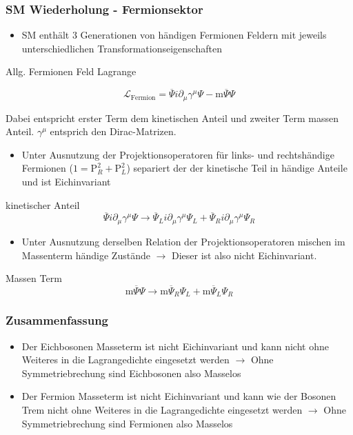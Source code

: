 \documentclass{beamer}
\begin{document}
\begin{frame}
\frametitle{SM Wiederholung - Fermionsektor}
\begin{itemize}
\item SM enthält 3 Generationen von händigen Fermionen Feldern mit jeweils unterschiedlichen Transformationseigenschaften 
\end{itemize}
\begin{block}{Allg. Fermionen Feld Lagrange}

\begin{equation*}
\mathscr{L}_{\text{Fermion}}=\overline{\Psi} i \partial_{\mu} \gamma^{\mu} \Psi -\text{m}\overline{\Psi} \Psi 
\end{equation*}
\end{block}
Dabei entspricht erster Term dem kinetischen Anteil und zweiter Term massen Anteil.  $\gamma^{\mu}$ entsprich den Dirac-Matrizen.
\end{frame}
\begin{frame}
\begin{itemize}
\item Unter Ausnutzung der Projektionsoperatoren für links- und rechtshändige Fermionen ($1=\text{P}_{R}^{2}+ \text{P}_{L}^{2}$) separiert der der kinetische Teil in händige Anteile und ist Eichinvariant 

\end{itemize}
\begin{block}{kinetischer Anteil}
\begin{equation*}
\overline{\Psi} i \partial_{\mu} \gamma^{\mu} \Psi  \rightarrow \overline{\Psi}_{L} i \partial_{\mu} \gamma^{\mu} \Psi_{L} +\overline{\Psi}_{R} i \partial_{\mu} \gamma^{\mu} \Psi_{R} 
\end{equation*}
\end{block}

\begin{itemize}
\item Unter Ausnutzung derselben Relation der Projektionsoperatoren mischen im Massenterm händige Zustände $\rightarrow$  Dieser ist also nicht Eichinvariant.
\end{itemize}

\begin{block}{Massen Term}
\begin{equation*}
\text{m}\overline{\Psi} \Psi  \rightarrow \text{m}\overline{\Psi}_{R} \Psi_{L} +\text{m}\overline{\Psi}_{L} \Psi_{R} 
\end{equation*}
\end{block}
\end{frame}
\begin{frame}
\frametitle{Zusammenfassung}
\begin{itemize}
\item Der Eichbosonen Masseterm ist nicht Eichinvariant und kann nicht ohne Weiteres in die Lagrangedichte  eingesetzt werden $\rightarrow$ Ohne Symmetriebrechung sind Eichbosonen also Masselos
\item Der Fermion Masseterm ist nicht Eichinvariant und kann wie der Bosonen Trem  nicht ohne Weiteres in die Lagrangedichte  eingesetzt werden $\rightarrow$ Ohne Symmetriebrechung sind Fermionen also Masselos
\end{itemize}
\end{frame}
\end{document}
